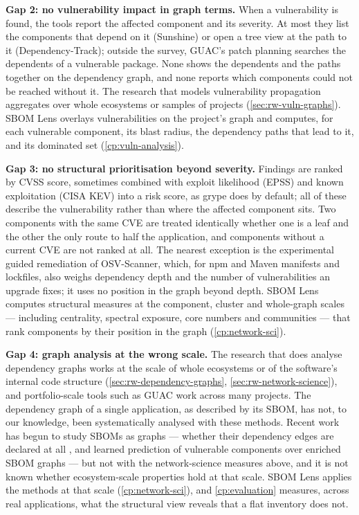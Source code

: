 \textbf{Gap 2: no vulnerability impact in graph terms.} When a vulnerability is found, the tools report the affected component and its severity. At most they list the components that depend on it (Sunshine) or open a tree view at the path to it (Dependency-Track); outside the survey, GUAC's patch planning searches the dependents of a vulnerable package. None shows the dependents and the paths together on the dependency graph, and none reports which components could not be reached without it. The research that models vulnerability propagation aggregates over whole ecosystems or samples of projects (\autoref{sec:rw-vuln-graphs}). SBOM Lens overlays vulnerabilities on the project's graph and computes, for each vulnerable component, its blast radius, the dependency paths that lead to it, and its dominated set (\autoref{cp:vuln-analysis}).

\textbf{Gap 3: no structural prioritisation beyond severity.} Findings are ranked by CVSS score, sometimes combined with exploit likelihood (EPSS) and known exploitation (CISA KEV) into a risk score, as grype does by default; all of these describe the vulnerability rather than where the affected component sits. Two components with the same CVE are treated identically whether one is a leaf and the other the only route to half the application, and components without a current CVE are not ranked at all. The nearest exception is the experimental guided remediation of OSV-Scanner, which, for npm and Maven manifests and lockfiles, also weighs dependency depth and the number of vulnerabilities an upgrade fixes; it uses no position in the graph beyond depth. SBOM Lens computes structural measures at the component, cluster and whole-graph scales --- including centrality, spectral exposure, core numbers and communities --- that rank components by their position in the graph (\autoref{cp:network-sci}).

\textbf{Gap 4: graph analysis at the wrong scale.} The research that does analyse dependency graphs works at the scale of whole ecosystems or of the software's internal code structure (\autoref{sec:rw-dependency-graphs}, \autoref{sec:rw-network-science}), and portfolio-scale tools such as GUAC work across many projects. The dependency graph of a single application, as described by its SBOM, has not, to our knowledge, been systematically analysed with these methods. Recent work has begun to study SBOMs as graphs --- whether their dependency edges are declared at all \citep{ZiebaKozarzewski2026}, and learned prediction of vulnerable components over enriched SBOM graphs \citep{Baird2026} --- but not with the network-science measures above, and it is not known whether ecosystem-scale properties hold at that scale. SBOM Lens applies the methods at that scale (\autoref{cp:network-sci}), and \autoref{cp:evaluation} measures, across real applications, what the structural view reveals that a flat inventory does not.

